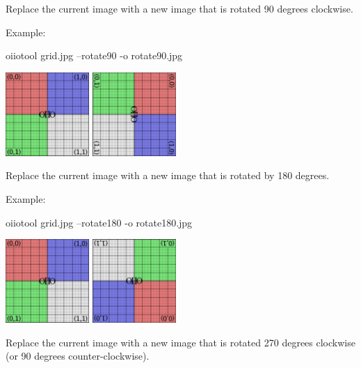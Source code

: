 \apiend

Replace the current image with a new image that is rotated 90 degrees
clockwise.

\noindent Example:
\begin{code}
    oiiotool grid.jpg --rotate90 -o rotate90.jpg
\end{code}
\spc \includegraphics[width=1.25in]{figures/grid-small.jpg}
\raisebox{40pt}{\large $\rightarrow$}
\includegraphics[width=1.25in]{figures/rotate90.jpg} \\
\apiend

Replace the current image with a new image that is rotated by
180 degrees.

\noindent Example:
\begin{code}
    oiiotool grid.jpg --rotate180 -o rotate180.jpg
\end{code}
\spc \includegraphics[width=1.25in]{figures/grid-small.jpg} 
\raisebox{40pt}{\large $\rightarrow$}
\includegraphics[width=1.25in]{figures/rotate180.jpg} \\
\apiend

Replace the current image with a new image that is rotated 270 degrees
clockwise (or 90 degrees counter-clockwise).

